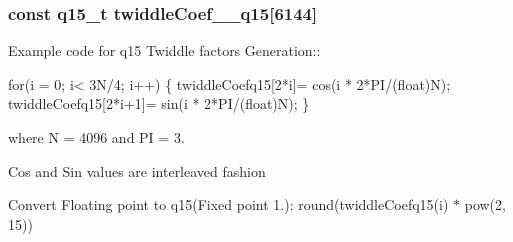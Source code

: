 \subsubsection[{\texorpdfstring{twiddle\+Coef\+\_\+4096\+\_\+q15}{twiddleCoef_4096_q15}}]{\setlength{\rightskip}{0pt plus 5cm}const q15\+\_\+t twiddle\+Coef\+\_\+\_\+q15\mbox{[}6144\mbox{]}}\hypertarget{group__CFFT__CIFFT_ga9b409d6995eab17805b1d1881d4bc652}{}\label{group__CFFT__CIFFT_ga9b409d6995eab17805b1d1881d4bc652}
\begin{DoxyParagraph}{}
Example code for q15 Twiddle factors Generation\+:\+: 
\end{DoxyParagraph}
\begin{DoxyParagraph}{}

\begin{DoxyPre}for(i = 0; i< 3N/4; i++)
\{
   twiddleCoefq15[2*i]= cos(i * 2*PI/(float)N);
   twiddleCoefq15[2*i+1]= sin(i * 2*PI/(float)N);
\} \end{DoxyPre}
 
\end{DoxyParagraph}
\begin{DoxyParagraph}{}
where N = 4096 and PI = 3. 
\end{DoxyParagraph}
\begin{DoxyParagraph}{}
Cos and Sin values are interleaved fashion 
\end{DoxyParagraph}
\begin{DoxyParagraph}{}
Convert Floating point to q15(Fixed point 1.)\+: round(twiddle\+Coefq15(i) $\ast$ pow(2, 15)) 
\end{DoxyParagraph}

